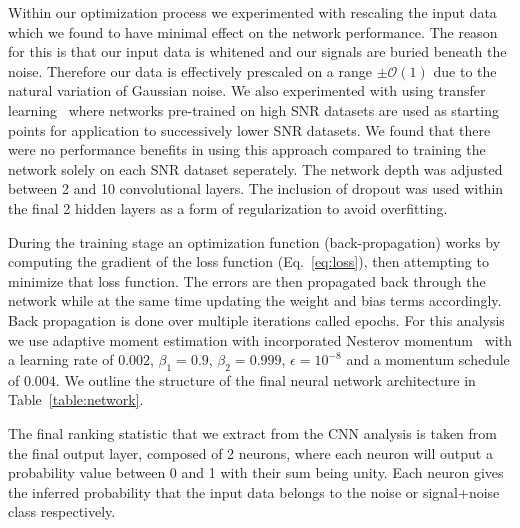 \documentclass[%
showpacs,
 amsmath,amssymb,
 aps,
 twocolumn,
 prl,
 reprint,
floatfix,
]{revtex4-1}
\begin{document}
%
%
Within our optimization process we experimented with rescaling the input data
which we found to have minimal effect on the network performance. The reason
for this is that our input data is whitened and our signals are buried beneath
the noise. Therefore our data is effectively prescaled on a range
$\pm\mathcal{O}(1)$ due to the natural variation of Gaussian noise. We also
experimented with using transfer learning~\cite{5288526} where networks
pre-trained on high \ac{SNR} datasets are used as starting points for
application to successively lower \ac{SNR} datasets. We found that there were
no performance benefits in using this approach compared to training the network
solely on each \ac{SNR} dataset seperately. The network depth was adjusted
between 2 and 10 convolutional layers. The inclusion of dropout was used within
the final 2 hidden layers as a form of regularization to avoid overfitting.

%
%
During the training stage an optimization function (back-propagation) works by
computing the gradient of the loss function (Eq.~\ref{eq:loss}), then
attempting to minimize that loss function. The errors are then propagated back
through the network while at the same time updating the weight and bias terms
accordingly.  Back propagation is done over multiple iterations called epochs.
For this analysis we use adaptive moment estimation with incorporated Nesterov
momentum~\cite{dozat2016incorporating} with a learning rate of $0.002$,
$\beta_{1}=0.9$, $\beta_{2}=0.999$, $\epsilon = 10^{-8}$ and a momentum
schedule of $0.004$. We outline the structure of the final neural network
architecture in Table~\ref{table:network}.



%
%
The final ranking statistic that we extract from the \ac{CNN} analysis is taken
from the final output layer, composed of 2 neurons, where each neuron will
output a probability value between 0 and 1 with their sum being unity. Each
neuron gives the inferred probability that the input data belongs to the noise
or signal+noise class respectively.
\end{document}
